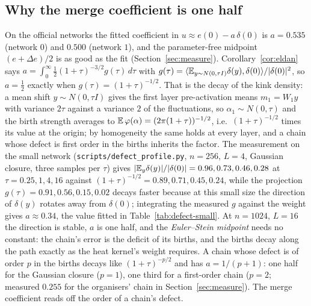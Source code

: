 \subsection{Why the merge coefficient is one half}
On the official networks the fitted coefficient in $u\approx e(0)-a\,\delta(0)$ is $a=0.535$ (network $0$) and
$0.500$ (network $1$), and the parameter-free midpoint $(e+\Delta e)/2$ is as good as the fit
(Section~\ref{sec:measure}). Corollary~\ref{cor:eldan} says $a=\int_0^\infty\tfrac12(1+\tau)^{-3/2}g(\tau)\,d\tau$
with $g(\tau)=\langle\mathbb E_{y\sim N(0,\tau I)}\delta(y),\delta(0)\rangle/|\delta(0)|^2$, so $a=\tfrac12$ exactly when
$g(\tau)=(1+\tau)^{-1/2}$. That is the decay of the kink density: a mean shift $y\sim N(0,\tau I)$ gives the first
layer pre-activation means $m_1=W_1y$ with variance $2\tau$ against a variance $2$ of the fluctuations, so
$\alpha_1\sim N(0,\tau)$ and the birth strength averages to $\mathbb E\,\varphi(\alpha)=(2\pi(1+\tau))^{-1/2}$, i.e.\
$(1+\tau)^{-1/2}$ times its value at the origin; by homogeneity the same holds at every layer, and a chain whose
defect is first order in the births inherits the factor. The measurement on the small network
(\texttt{scripts/defect\_profile.py}, $n=256$, $L=4$, Gaussian closure, three samples per $\tau$) gives
$|\mathbb E_y\delta(y)|/|\delta(0)|=0.96,0.73,0.46,0.28$ at $\tau=0.25,1,4,16$ against $(1+\tau)^{-1/2}=0.89,0.71,0.45,0.24$,
while the projection $g(\tau)=0.91,0.56,0.15,0.02$ decays faster because at this small size the direction of
$\delta(y)$ rotates away from $\delta(0)$; integrating the measured $g$ against the weight gives $a\approx0.34$,
the value fitted in Table~\ref{tab:defect-small}. At $n=1024$, $L=16$ the direction is stable, $a$ is one half, and
the \emph{Euler--Stein midpoint} needs no constant: the chain's error is the deficit of its births, and the births
decay along the path exactly as the heat kernel's weight requires. A chain whose defect is of order $p$ in the
births decays like $(1+\tau)^{-p/2}$ and has $a=1/(p+1)$: one half for the Gaussian closure ($p=1$), one third for a
first-order chain ($p=2$; measured $0.255$ for the organisers' chain in Section~\ref{sec:measure}). The merge
coefficient reads off the order of a chain's defect.
